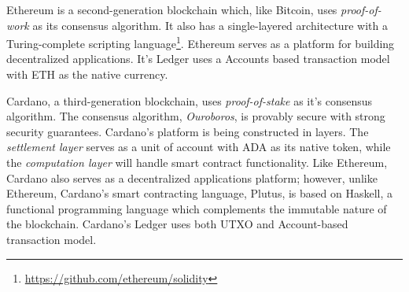 		Ethereum\cite{buterin2014ethereum} is a second-generation blockchain which, like Bitcoin, uses \textit{proof-of-work} as its consensus algorithm. It also has a single-layered architecture with a Turing-complete scripting language\footnote{\url{https://github.com/ethereum/solidity}}. Ethereum serves as a platform for building decentralized applications. It's Ledger uses a Accounts based transaction model with ETH as the native currency.
		
		Cardano, a third-generation blockchain, uses \textit{proof-of-stake} as it's consensus algorithm. The consensus algorithm, \textit{Ouroboros}\cite{kiayias2017ouroboros}, is provably secure with strong security guarantees. Cardano's platform is being constructed in layers. The \textit{settlement layer} serves as a unit of account with ADA as its native token, while the \textit{computation layer} will handle smart contract functionality. Like Ethereum, Cardano also serves as a decentralized applications platform; however, unlike Ethereum, Cardano's smart contracting language, Plutus, is based on Haskell, a functional programming language which complements the immutable nature of the blockchain. Cardano's Ledger\cite{zahnentferner2018chimeric} uses both UTXO and Account-based transaction model.